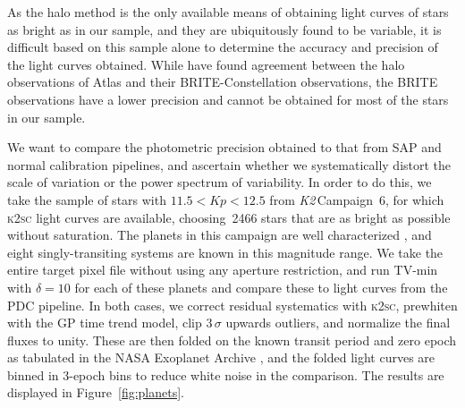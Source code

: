 \documentclass[modern]{aastex62}
\newcommand\ktwo{\emph{K2}\,}
\begin{document}
As the halo method is the only available means of obtaining light curves of stars as bright as in our sample, and they are ubiquitously found to be variable, it is difficult based on this sample alone to determine the accuracy and precision of the light curves obtained. While \citet{Kallinger2018} have found agreement between the \citet{White2017} halo observations of Atlas and their BRITE-Constellation observations, the BRITE observations have a lower precision and cannot be obtained for most of the stars in our sample. 

We want to compare the photometric precision obtained to that from SAP and normal calibration pipelines, and ascertain whether we systematically distort the scale of variation or the power spectrum of variability. In order to do this, we take the sample of stars with $11.5 <  Kp < 12.5$ from \ktwo Campaign~6, for which \textsc{k2sc} light curves are available, choosing~2466 stars that are as bright as possible without saturation. The planets in this campaign are well characterized \citep[e.g.][]{Pope2016planets}, and eight singly-transiting systems are known in this magnitude range. We take the entire target pixel file without using any aperture restriction, and run TV-min with $\delta = 10$ for each of these planets and compare these to light curves from the PDC pipeline. In both cases, we correct residual systematics with \textsc{k2sc}, prewhiten with the GP time trend model, clip $3\,\sigma$ upwards outliers, and normalize the final fluxes to unity. These are then folded on the known transit period and zero epoch as tabulated in the NASA Exoplanet Archive \citep{2013PASP..125..989A}, and the folded light curves are binned in 3-epoch bins to reduce white noise in the comparison. The results are displayed in Figure~\ref{fig:planets}.

\begin{figure*}
\caption{The eight transiting single-planet systems in \ktwo Campaign~6 in the magnitude range $11.5 < Kp < 12.5$, with PDC light curves (blue) and TV-min light curves (orange) overlaid. These have been identically \textsc{k2sc}-corrected, whitened, outlier-clipped, folded and binned as described in Section~\ref{sec:benchmarking}. The depths and shapes of the transits agree closely except for EPIC~212460519, for which the TV-min transit is slightly shallower, and EPIC~212555594, for which TV-min is significantly shallower.}
\label{fig:planets}
\end{figure*}
\end{document}
